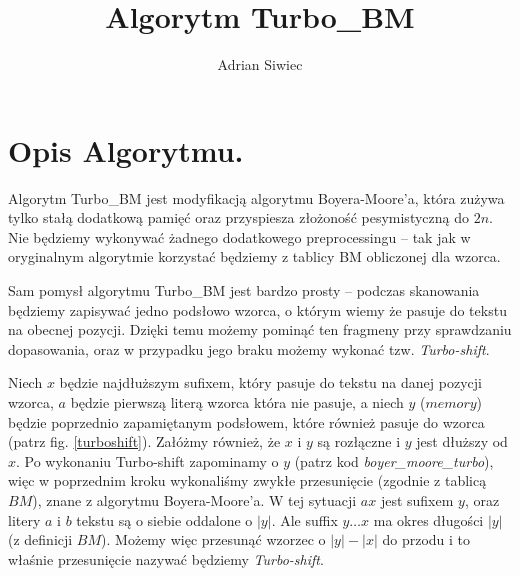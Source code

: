 \documentclass[12pt]{article}
\newcommand{\TBM}{Turbo\_BM }
\begin{document}
\title{Algorytm \TBM}
\author{Adrian Siwiec}
\maketitle

\section*{Opis Algorytmu.}
Algorytm \TBM jest modyfikacją algorytmu Boyera-Moore'a, która zużywa tylko stałą dodatkową pamięć oraz przyspiesza złożoność pesymistyczną do $2n$. Nie będziemy wykonywać żadnego dodatkowego preprocessingu -- tak jak w oryginalnym algorytmie korzystać będziemy z tablicy BM obliczonej dla wzorca.
  
Sam pomysł algorytmu \TBM jest bardzo prosty -- podczas skanowania będziemy zapisywać jedno podsłowo wzorca, o którym wiemy że pasuje do tekstu na obecnej pozycji. Dzięki temu możemy pominąć ten fragmeny przy sprawdzaniu dopasowania, oraz w przypadku jego braku możemy wykonać tzw. \emph{Turbo-shift}.

Niech $x$ będzie najdłuższym sufixem, który pasuje do tekstu na danej pozycji wzorca, $a$ będzie pierwszą literą wzorca która nie pasuje, a niech $y$ ($memory$) będzie poprzednio zapamiętanym podsłowem, które również pasuje do wzorca (patrz fig. \ref{turboshift}). Załóżmy również, że $x$ i $y$ są rozłączne i $y$ jest dłuższy od $x$. Po wykonaniu Turbo-shift zapominamy o $y$ (patrz kod \emph{boyer\_moore\_turbo}), więc w poprzednim kroku wykonaliśmy zwykłe przesunięcie (zgodnie z tablicą $BM$), znane z algorytmu Boyera-Moore'a. W tej sytuacji $ax$ jest sufixem $y$, oraz litery $a$ i $b$ tekstu są o siebie oddalone o $|y|$. Ale suffix $y\ldots x$ ma okres długości $|y|$ (z definicji $BM$). Możemy więc przesunąć wzorzec o $|y| - |x|$ do przodu i to właśnie przesunięcie nazywać będziemy \emph{Turbo-shift}.

\end{document}
